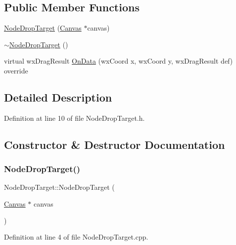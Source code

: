 \subsection*{Public Member Functions}
\begin{DoxyCompactItemize}
\item 
\hyperlink{class_node_drop_target_a528bf4a549220c117affc9373709d616}{Node\+Drop\+Target} (\hyperlink{class_canvas}{Canvas} $\ast$canvas)
\item 
\hyperlink{class_node_drop_target_a30bf75238522bedea94669a51e8aeb6d}{$\sim$\+Node\+Drop\+Target} ()
\item 
virtual wx\+Drag\+Result \hyperlink{class_node_drop_target_ab52b10fa0071d44934a56d4f6031bfdf}{On\+Data} (wx\+Coord x, wx\+Coord y, wx\+Drag\+Result def) override
\end{DoxyCompactItemize}


\subsection{Detailed Description}


Definition at line 10 of file Node\+Drop\+Target.\+h.



\subsection{Constructor \& Destructor Documentation}
\mbox{\label{class_node_drop_target_a528bf4a549220c117affc9373709d616}} 
\subsubsection{\texorpdfstring{Node\+Drop\+Target()}{NodeDropTarget()}}
{\footnotesize\ttfamily Node\+Drop\+Target\+::\+Node\+Drop\+Target (\begin{DoxyParamCaption}\item[{\hyperlink{class_canvas}{Canvas} $\ast$}]{canvas }\end{DoxyParamCaption})}



Definition at line 4 of file Node\+Drop\+Target.\+cpp.

\mbox{\label{class_node_drop_target_a30bf75238522bedea94669a51e8aeb6d}} 

